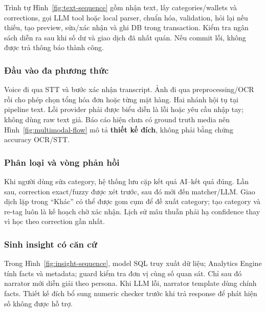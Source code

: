 Trình tự Hình~\ref{fig:text-sequence} gồm nhận text, lấy categories/wallets và corrections, gọi LLM tool hoặc local parser, chuẩn hóa, validation, hỏi lại nếu thiếu, tạo preview, sửa/xác nhận và ghi DB trong transaction. Kiểm tra ngân sách diễn ra sau khi số dư và giao dịch đã nhất quán. Nếu commit lỗi, không được trả thông báo thành công.

\subsubsection{Đầu vào đa phương thức}


Voice đi qua STT và bước xác nhận transcript. Ảnh đi qua preprocessing/OCR rồi cho phép chọn tổng hóa đơn hoặc từng mặt hàng. Hai nhánh hội tụ tại pipeline text. Lỗi provider phải được biểu diễn là lỗi hoặc yêu cầu nhập tay; không dùng raw text giả. Báo cáo hiện chưa có ground truth media nên Hình~\ref{fig:multimodal-flow} mô tả \textbf{thiết kế đích}, không phải bằng chứng accuracy OCR/STT.

\subsubsection{Phân loại và vòng phản hồi}


Khi người dùng sửa category, hệ thống lưu cặp kết quả AI--kết quả đúng. Lần sau, correction exact/fuzzy được xét trước, sau đó mới đến matcher/LLM. Giao dịch lặp trong ``Khác'' có thể được gom cụm để đề xuất category; tạo category và re-tag luôn là kế hoạch chờ xác nhận. Lịch sử mâu thuẫn phải hạ confidence thay vì học theo correction gần nhất.

\subsubsection{Sinh insight có căn cứ}


Trong Hình~\ref{fig:insight-sequence}, model SQL truy xuất dữ liệu; Analytics Engine tính facts và metadata; guard kiểm tra đơn vị cùng số quan sát. Chỉ sau đó narrator mới diễn giải theo persona. Khi LLM lỗi, narrator template dùng chính facts. Thiết kế đích bổ sung numeric checker trước khi trả response để phát hiện số không được hỗ trợ.

